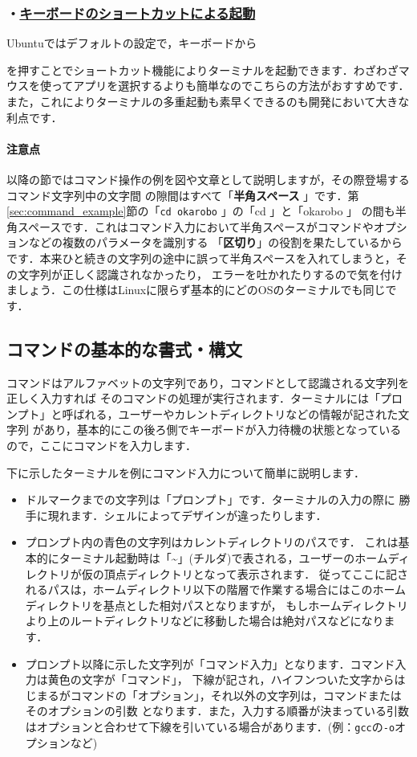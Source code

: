 \documentclass[autodetect-engine,dvi=dvipdfmx,ja=standard,a4j]{bxjsarticle}
\begin{document}
\subsubsection*{・\underline{キーボードのショートカットによる起動}}
Ubuntuではデフォルトの設定で，キーボードから
\begin{center}
\end{center}
を押すことでショートカット機能によりターミナルを起動できます．わざわざマウスを使ってアプリを選択するよりも簡単なのでこちらの方法がおすすめです．
また，これによりターミナルの多重起動も素早くできるのも開発において大きな利点です．

\paragraph*{注意点}
以降の節ではコマンド操作の例を図や文章として説明しますが，その際登場するコマンド文字列中の文字間
の隙間はすべて「\textbf{半角スペース} 」です．第\ref{sec:command_example}節の「\texttt{cd okarobo} 」の「cd 」と「okarobo 」
の間も半角スペースです．これはコマンド入力において半角スペースがコマンドやオプションなどの複数のパラメータを識別する
「\textbf{区切り}」の役割を果たしているからです．本来ひと続きの文字列の途中に誤って半角スペースを入れてしまうと，その文字列が正しく認識されなかったり，
エラーを吐かれたりするので気を付けましょう．この仕様はLinuxに限らず基本的にどのOSのターミナルでも同じです．

\subsection{コマンドの基本的な書式・構文}
コマンドはアルファベットの文字列であり，コマンドとして認識される文字列を正しく入力すれば
そのコマンドの処理が実行されます．ターミナルには「プロンプト」と呼ばれる，ユーザーやカレントディレクトリなどの情報が記された文字列
があり，基本的にこの後ろ側でキーボードが入力待機の状態となっているので，ここにコマンドを入力します．

下に示したターミナルを例にコマンド入力について簡単に説明します．
\begin{itemize}
    \item ドルマークまでの文字列は「プロンプト」です．ターミナルの入力の際に
    勝手に現れます．シェルによってデザインが違ったりします．
    \item プロンプト内の青色の文字列はカレントディレクトリのパスです．
    これは基本的にターミナル起動時は「\textbf{\textasciitilde}」(チルダ)で表される，ユーザーのホームディレクトリが仮の頂点ディレクトリとなって表示されます．
    従ってここに記されるパスは，ホームディレクトリ以下の階層で作業する場合にはこのホームディレクトリを基点とした相対パスとなりますが，
    もしホームディレクトリより上のルートディレクトリなどに移動した場合は絶対パスなどになります．
    \item プロンプト以降に示した文字列が「コマンド入力」となります．コマンド入力は黄色の文字が「コマンド」，
    下線が記され，ハイフンついた文字からはじまるがコマンドの「オプション」，それ以外の文字列は，コマンドまたはそのオプションの引数
    となります．また，入力する順番が決まっている引数はオプションと合わせて下線を引いている場合があります．(例：\verb|gcc|の\verb|-o|オプションなど)
\end{itemize}
\end{document}
